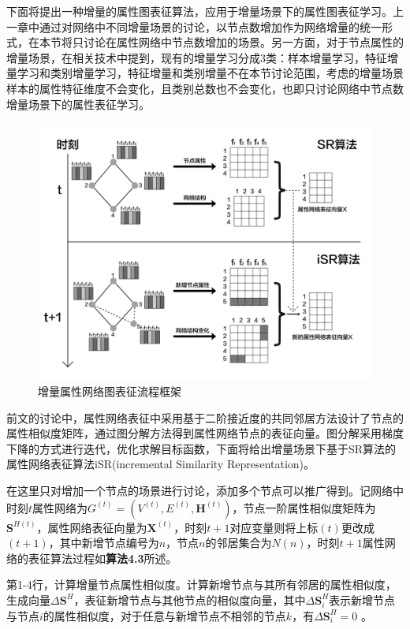 下面将提出一种增量的属性图表征算法，应用于增量场景下的属性图表征学习。上一章中通过对网络中不同增量场景的讨论，以节点数增加作为网络增量的统一形式，在本节将只讨论在属性网络中节点数增加的场景。另一方面，对于节点属性的增量场景，在相关技术中提到，现有的增量学习分成3类\cite{zhong2017survey}：样本增量学习，特征增量学习和类别增量学习，特征增量和类别增量不在本节讨论范围，考虑的增量场景样本的属性特征维度不会变化，且类别总数也不会变化，也即只讨论网络中节点数增量场景下的属性表征学习。
\begin{figure}
	\centering
	\includegraphics[width=6in]{figures/incremental_attributed_embedding}
	\caption{增量属性网络图表征流程框架}
	\label{fig:incremental_attributed_embedding}
\end{figure}

前文的讨论中，属性网络表征中采用基于二阶接近度的共同邻居方法设计了节点的属性相似度矩阵，通过图分解方法得到属性网络节点的表征向量。图分解采用梯度下降的方式进行迭代，优化求解目标函数，下面将给出增量场景下基于SR算法的属性网络表征算法iSR(incremental Similarity Representation)。

在这里只对增加一个节点的场景进行讨论，添加多个节点可以推广得到。记网络中时刻$t$属性网络为$G^{(t)} = (V^{(t)}, E^{(t)},\textbf{H}^{(t)})$，节点一阶属性相似度矩阵为$\textbf{S}^{H(t)}$，属性网络表征向量为$\textbf{X}^{(t)}$，时刻$t+1$对应变量则将上标$(t)$更改成$(t+1)$，其中新增节点编号为$n$，节点$n$的邻居集合为$N(n)$，时刻$t+1$属性网络的表征算法过程如\textbf{算法4.3}所述。

第1-4行，计算增量节点属性相似度。计算新增节点与其所有邻居的属性相似度，生成向量$\Delta\textbf{S}^{H}$，表征新增节点与其他节点的相似度向量，其中$\Delta\textbf{S}^{H}_i$表示新增节点与节点$i$的属性相似度，对于任意与新增节点不相邻的节点$k$，有$\Delta\textbf{S}^{H}_i=0$ 。

